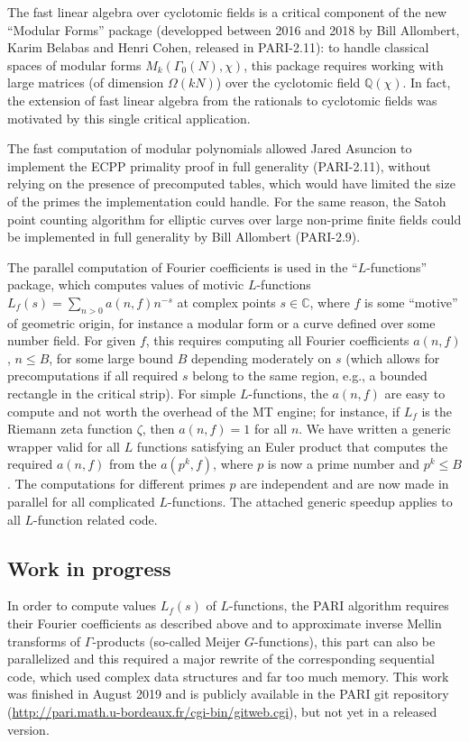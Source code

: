 \documentclass{deliverablereport}
\begin{document}
The fast linear algebra over cyclotomic fields is a critical component of the
new ``Modular Forms'' package (developped between 2016 and 2018 by Bill
Allombert, Karim Belabas and Henri Cohen, released in PARI-2.11): to handle
classical spaces of modular forms $M_k(\Gamma_0(N), \chi)$, this package
requires working with large matrices (of dimension $\Omega(kN)$) over the
cyclotomic field $\mathbb{Q}(\chi)$. In fact, the extension of fast linear
algebra from the rationals to cyclotomic fields was motivated by this single
critical application.

The fast computation of modular polynomials allowed Jared Asuncion to
implement the ECPP primality proof in full generality (PARI-2.11), without
relying on the presence of precomputed tables, which would have limited the
size of the primes the implementation could handle. For the same reason, the
Satoh point counting algorithm for elliptic curves over large non-prime
finite fields could be implemented in full generality by Bill Allombert
(PARI-2.9).

The parallel computation of Fourier coefficients is used
in the ``$L$-functions'' package, which computes values of motivic
$L$-functions $L_f(s) = \sum_{n>0} a(n,f) n^{-s}$ at complex points $s\in
\mathbb{C}$, where $f$ is some ``motive'' of geometric origin, for instance a
modular form or a curve defined over some number field. For given $f$, this
requires computing all Fourier coefficients $a(n,f)$, $n \leq B$, for
some large bound $B$ depending moderately on $s$ (which allows for
precomputations if all required $s$ belong to the same region, e.g., a
bounded rectangle in the critical strip). For simple $L$-functions, the
$a(n,f)$ are easy to compute and not worth the overhead of the MT engine; for
instance, if $L_f$ is the Riemann zeta function $\zeta$, then $a(n,f) = 1$
for all $n$. We have written a generic wrapper valid for all $L$ functions
satisfying an Euler product that computes the required $a(n,f)$ from the
$a(p^k,f)$, where $p$ is now a prime number and $p^k\leq B$. The computations
for different primes $p$ are independent and are now made in parallel for all
complicated $L$-functions. The attached generic speedup applies to all
$L$-function related code.


\subsection{Work in progress}

In order to compute values $L_f(s)$ of $L$-functions, the PARI algorithm 
requires their Fourier coefficients as described above and to approximate
inverse Mellin transforms of $\Gamma$-products (so-called Meijer
$G$-functions), this part can also be parallelized and this required a major
rewrite of the corresponding sequential code, which used complex data
structures and far too much memory. This work was finished in August 2019 and
is publicly available in the PARI git repository
(\url{http://pari.math.u-bordeaux.fr/cgi-bin/gitweb.cgi}), but not yet
in a released version.
\end{document}
